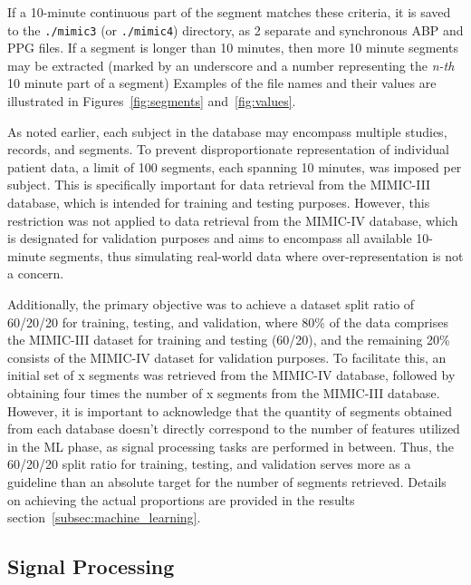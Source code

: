 If a 10-minute continuous part of the segment matches these criteria, it is saved to the \texttt{./mimic3} (or \texttt{./mimic4}) directory, as 2 separate and synchronous ABP and PPG files.
If a segment is longer than 10 minutes, then more 10 minute segments may be extracted (marked by an underscore and a number representing the \textit{n-th} 10 minute part of a segment)
Examples of the file names and their values are illustrated in Figures~\ref{fig:segments} and~\ref{fig:values}.

\newpage
As noted earlier, each subject in the database may encompass multiple studies, records, and segments.
To prevent disproportionate representation of individual patient data, a limit of 100 segments, each spanning 10 minutes, was imposed per subject.
This is specifically important for data retrieval from the MIMIC-III database, which is intended for training and testing purposes.
However, this restriction was not applied to data retrieval from the MIMIC-IV database, which is designated for validation purposes and aims to encompass all available 10-minute segments, thus simulating real-world data where over-representation is not a concern.

Additionally, the primary objective was to achieve a dataset split ratio of 60/20/20 for training, testing, and validation, where 80\% of the data comprises the MIMIC-III dataset for training and testing (60/20), and the remaining 20\% consists of the MIMIC-IV dataset for validation purposes.
To facilitate this, an initial set of x segments was retrieved from the MIMIC-IV database, followed by obtaining four times the number of x segments from the MIMIC-III database.
However, it is important to acknowledge that the quantity of segments obtained from each database doesn't directly correspond to the number of features utilized in the ML phase, as signal processing tasks are performed in between.
Thus, the 60/20/20 split ratio for training, testing, and validation serves more as a guideline than an absolute target for the number of segments retrieved.
Details on achieving the actual proportions are provided in the results section~\ref{subsec:machine_learning}.

\subsection{Signal Processing}
\label{subsec:sp_methods}

